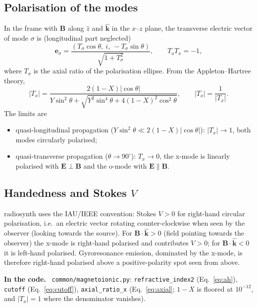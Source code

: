 \documentclass[11pt,a4paper]{article}
\newcommand{\code}[1]{\texttt{#1}}
\newcommand{\vect}[1]{\bm{#1}}
\newenvironment{incode}{\par\smallskip\noindent\begin{minipage}{\linewidth}\small\color{accent!80!black}\textbf{In the code.}~}{\end{minipage}\par\smallskip}
\begin{document}
\subsection{Polarisation of the modes}
In the frame with $\vect B$ along $\hat z$ and $\hat{\vect k}$ in the $x$--$z$ plane, the
transverse electric vector of mode $\sigma$ is (longitudinal part neglected)
\begin{equation}
  \vect e_\sigma=\frac{\left(T_\sigma\cos\theta,\ i,\ -T_\sigma\sin\theta\right)}{\sqrt{1+T_\sigma^2}},
  \qquad T_oT_x=-1,
\end{equation}
where $T_\sigma$ is the axial ratio of the polarisation ellipse. From the Appleton--Hartree
theory,
\begin{equation}
  |T_x| = \frac{2(1-X)|\cos\theta|}{Y\sin^2\theta+\sqrt{Y^2\sin^4\theta+4(1-X)^2\cos^2\theta}},
  \qquad |T_o|=\frac{1}{|T_x|}.
  \label{eq:axial}
\end{equation}
The limits are
\begin{itemize}
  \item quasi-longitudinal propagation ($Y\sin^2\theta\ll2(1-X)|\cos\theta|$):
        $|T_x|\to1$, both modes circularly polarised;
  \item quasi-transverse propagation ($\theta\to90^\circ$): $T_x\to0$, the x-mode is linearly
        polarised with $\vect E\perp\vect B$ and the o-mode with $\vect E\parallel\vect B$.
\end{itemize}

\subsection{Handedness and Stokes $V$}
\textsf{radiosynth} uses the IAU/IEEE convention: Stokes $V>0$ for right-hand circular
polarisation, i.e.\ an electric vector rotating counter-clockwise when seen by the observer
(looking towards the source). For $\vect B\cdot\hat{\vect k}>0$ (field pointing towards the
observer) the x-mode is right-hand polarised and contributes $V>0$; for
$\vect B\cdot\hat{\vect k}<0$ it is left-hand polarised. Gyroresonance emission, dominated by
the x-mode, is therefore right-hand polarised above a positive-polarity spot seen from above.

\begin{incode}
\code{common/magnetoionic.py}: \code{refractive\_index2} (Eq.~\ref{eq:ah}), \code{cutoff}
(Eq.~\ref{eq:cutoff}), \code{axial\_ratio\_x} (Eq.~\ref{eq:axial}; $1-X$ is floored at
$10^{-12}$, and $|T_x|=1$ where the denominator vanishes).
\end{incode}
\end{document}
